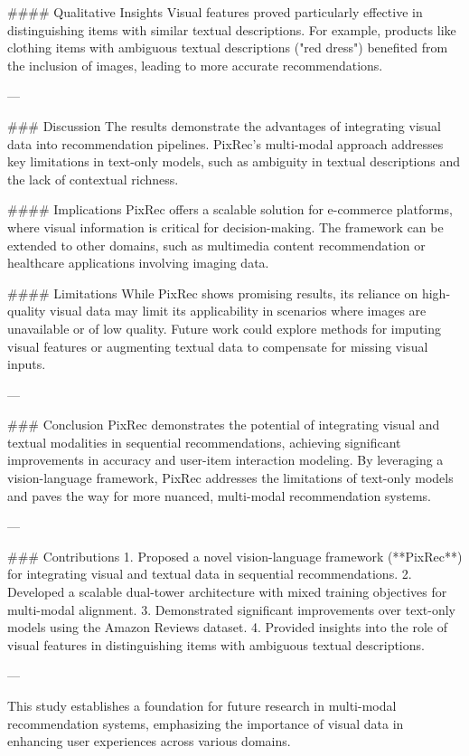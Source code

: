 #### Qualitative Insights  
Visual features proved particularly effective in distinguishing items with similar textual descriptions. For example, products like clothing items with ambiguous textual descriptions ("red dress") benefited from the inclusion of images, leading to more accurate recommendations.  

---

### Discussion  
The results demonstrate the advantages of integrating visual data into recommendation pipelines. PixRec's multi-modal approach addresses key limitations in text-only models, such as ambiguity in textual descriptions and the lack of contextual richness.  

#### Implications  
PixRec offers a scalable solution for e-commerce platforms, where visual information is critical for decision-making. The framework can be extended to other domains, such as multimedia content recommendation or healthcare applications involving imaging data.  

#### Limitations  
While PixRec shows promising results, its reliance on high-quality visual data may limit its applicability in scenarios where images are unavailable or of low quality. Future work could explore methods for imputing visual features or augmenting textual data to compensate for missing visual inputs.  

---

### Conclusion  
PixRec demonstrates the potential of integrating visual and textual modalities in sequential recommendations, achieving significant improvements in accuracy and user-item interaction modeling. By leveraging a vision-language framework, PixRec addresses the limitations of text-only models and paves the way for more nuanced, multi-modal recommendation systems.  

---

### Contributions  
1. Proposed a novel vision-language framework (**PixRec**) for integrating visual and textual data in sequential recommendations.  
2. Developed a scalable dual-tower architecture with mixed training objectives for multi-modal alignment.  
3. Demonstrated significant improvements over text-only models using the Amazon Reviews dataset.  
4. Provided insights into the role of visual features in distinguishing items with ambiguous textual descriptions.  

---

This study establishes a foundation for future research in multi-modal recommendation systems, emphasizing the importance of visual data in enhancing user experiences across various domains.